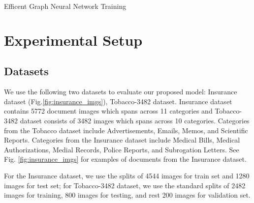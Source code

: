 \documentclass[letterpaper]{article}
\begin{document}
 \begin{algorithm}[h!]
 \caption{Efficent Graph Neural Network Training}
        \DontPrintSemicolon
\label{psuedocode}
    \end{algorithm}
    

 \section{Experimental Setup}
\subsection{Datasets} 
We use the following two datasets to evaluate our proposed model: Insurance dataset (Fig.\ref{fig:insurance_imgs}), Tobacco-3482 dataset\cite{kumar2014structural}. Insurance dataset contains 5772 document images which spans across 11 categories and Tobacco-3482 dataset consists of 3482 images which spans across 10 categories. Categories from the Tobacco dataset include Advertisements, Emails, Memos, and Scientific Reports. Categories from the Insurance dataset include Medical Bills, Medical Authorizations, Medial Records, Police Reports, and Subrogation Letters. See Fig. \ref{fig:insurance_imgs} for examples of documents from the Insurance dataset.

For the Insurance dataset, we use the  
splits of 4544 images for train set and 1280 images  for test set; for Tobacco-3482 dataset, we use the
standard splits of  2482 images for training, 800 images for testing, and rest 200 images for validation set.
\end{document}
